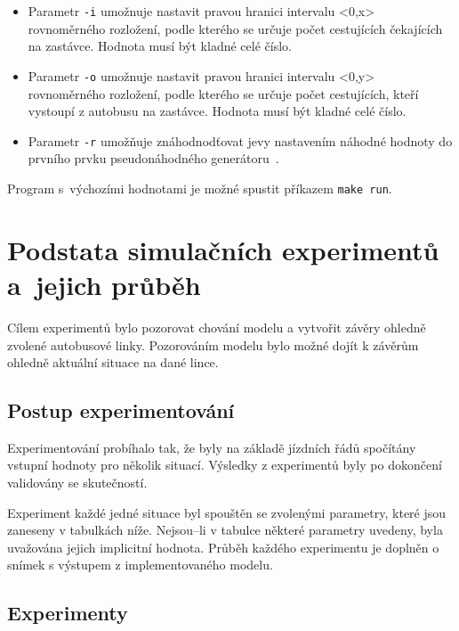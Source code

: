 \documentclass[a4paper]{article}
\begin{document}
\begin{itemize}
            \item Parametr \texttt{-i} umožnuje nastavit pravou hranici intervalu <0,x> rovnoměrného rozložení, podle kterého se určuje počet cestujících čekajících na zastávce. Hodnota musí být kladné celé číslo.
            \item Parametr \texttt{-o} umožnuje nastavit pravou hranici intervalu <0,y> rovnoměrného rozložení, podle kterého se určuje počet cestujících, kteří vystoupí z autobusu na zastávce. Hodnota musí být kladné celé číslo.
            \item Parametr \texttt{-r} umožňuje znáhodnodťovat jevy nastavením náhodné hodnoty do prvního prvku pseudonáhodného generátoru~\cite[snímek 72]{IMS_slides}. 
            \end{itemize}

            Program s~výchozími hodnotami je možné spustit příkazem \texttt{make run}.

    \section{Podstata simulačních experimentů a~jejich průběh}
    \label{sec:simulation}

        Cílem experimentů bylo pozorovat chování modelu a vytvořit závěry ohledně zvolené autobusové linky. Pozorováním modelu bylo možné dojít k závěrům ohledně aktuální situace na dané lince.
        \subsection{Postup experimentování}
        \label{subsec:experiments_methods}
			Experimentování probíhalo tak, že byly na základě jízdních řádů spočítány vstupní hodnoty pro několik situací. Výsledky z experimentů byly po dokončení validovány se skutečností.

            Experiment každé jedné situace byl spouštěn se zvolenými parametry, které jsou zaneseny v tabulkách níže. Nejsou--li v tabulce některé parametry uvedeny, byla uvažována jejich implicitní hodnota. Průběh každého experimentu je doplněn o snímek s výstupem z implementovaného modelu.
        \subsection{Experimenty}
        \label{subsec:experiments}
\end{document}

